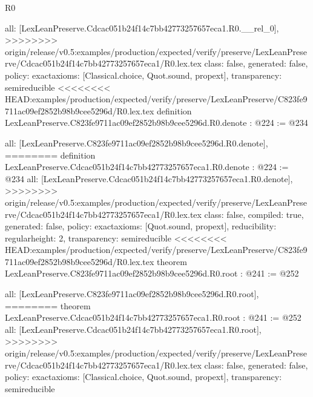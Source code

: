 \begin{lexlean}{R0}
\begin{coremodule}
{{{{  all: [LexLeanPreserve.Cdcac051b24f14c7bb42773257657eca1.R0.__rel_0],
>>>>>>>> origin/release/v0.5:examples/production/expected/verify/preserve/LexLeanPreserve/Cdcac051b24f14c7bb42773257657eca1/R0.lex.tex
  class: false,
  generated: false,
  policy: exact{axioms: [Classical.choice, Quot.sound, propext]},
  transparency: semireducible
}
<<<<<<<< HEAD:examples/production/expected/verify/preserve/LexLeanPreserve/C823fe9711ac09ef2852b98b9cee5296d/R0.lex.tex
definition LexLeanPreserve.C823fe9711ac09ef2852b98b9cee5296d.R0.denote : @224 := @234 {
  all: [LexLeanPreserve.C823fe9711ac09ef2852b98b9cee5296d.R0.denote],
========
definition LexLeanPreserve.Cdcac051b24f14c7bb42773257657eca1.R0.denote : @224 := @234 {
  all: [LexLeanPreserve.Cdcac051b24f14c7bb42773257657eca1.R0.denote],
>>>>>>>> origin/release/v0.5:examples/production/expected/verify/preserve/LexLeanPreserve/Cdcac051b24f14c7bb42773257657eca1/R0.lex.tex
  class: false,
  compiled: true,
  generated: false,
  policy: exact{axioms: [Quot.sound, propext]},
  reducibility: regular{height: 2},
  transparency: semireducible
}
<<<<<<<< HEAD:examples/production/expected/verify/preserve/LexLeanPreserve/C823fe9711ac09ef2852b98b9cee5296d/R0.lex.tex
theorem LexLeanPreserve.C823fe9711ac09ef2852b98b9cee5296d.R0.root : @241 := @252 {
  all: [LexLeanPreserve.C823fe9711ac09ef2852b98b9cee5296d.R0.root],
========
theorem LexLeanPreserve.Cdcac051b24f14c7bb42773257657eca1.R0.root : @241 := @252 {
  all: [LexLeanPreserve.Cdcac051b24f14c7bb42773257657eca1.R0.root],
>>>>>>>> origin/release/v0.5:examples/production/expected/verify/preserve/LexLeanPreserve/Cdcac051b24f14c7bb42773257657eca1/R0.lex.tex
  class: false,
  generated: false,
  policy: exact{axioms: [Classical.choice, Quot.sound, propext]},
  transparency: semireducible
}

}}}}}
\end{coremodule}
\end{lexlean}
